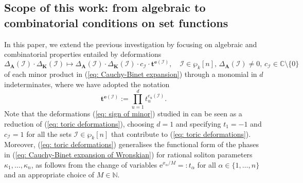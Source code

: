 \documentclass[10pt]{article}
\theoremstyle{remark}%
\theoremstyle{definition}%
\begin{document}
\subsection{Scope of this work: from algebraic to combinatorial conditions on set functions}
\label{subsec: scope of this work}

In this paper, we extend the previous investigation by focusing on algebraic and combinatorial properties entailed by deformations  
\begin{equation}
\Delta_{\mathbf{A}}(\mathcal{I})\cdot\Delta_{\mathbf{K}}(\mathcal{I}) \mapsto \Delta_{\mathbf{A}}(\mathcal{I})\cdot\Delta_{\mathbf{K}}(\mathcal{I}) \cdot c_{\mathcal{I}}\cdot \mathbf{t}^{\mathbf{e}(\mathcal{I})}, \quad \mathcal{I}\in\wp_{k}[n],\,\Delta_{\mathbf{A}}(\mathcal{I})\neq 0,\, c_{\mathcal{I}}\in\mathbb{C}\setminus\{0\}
\label{eq: toric deformations} 
\end{equation}
of each minor product in (\ref{eq: Cauchy-Binet expansion}) through a monomial in $d$ indeterminates, where we have adopted the notation 
\begin{equation}
    \mathbf{t}^{\mathbf{e}(\mathcal{I})}:=\prod_{u=1}^{d} t_{u}^{e_{u}(\mathcal{I})}.
    \label{eq: monomial notation}
\end{equation} 
Note that the deformations (\ref{eq: sign of minor}) studied in \cite{Angelelli2019} can be seen as a reduction of (\ref{eq: toric deformations}), choosing $d=1$ and specifying $t_{1}=-1$ and $c_{\mathcal{I}}=1$ for all the sets $\mathcal{I}\in\wp_{k}[n]$ that contribute to (\ref{eq: toric deformations}). Moreover, (\ref{eq: toric deformations}) generalises the functional form of the phases in (\ref{eq: Cauchy-Binet expansion of Wronskian}) for rational soliton parameters $\kappa_{1},\dots,\kappa_{n}$, as follows from the change of variables $\mathrm{e}^{x_{\alpha}/M}=:t_{\alpha}$ for all $\alpha\in\{1,\dots,n\}$ and an appropriate choice of $M\in\mathbb{N}$. 
\end{document}
